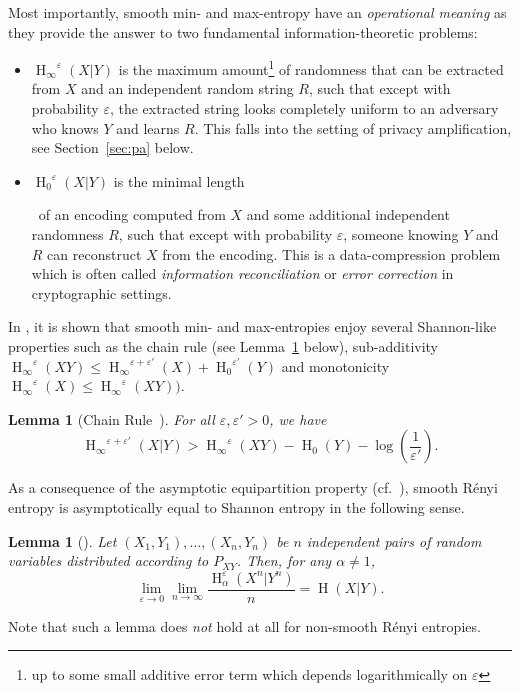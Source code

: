 \documentclass[final,11pt,a4paper]{report}
\newtheorem{lemma}[theorem]{Lemma}
\renewcommand*{\H}{\operatorname{H}}   %
\newcommand*{\hmin}{\ensuremath{\H_{\infty}}}
\newcommand*{\hmax}{\ensuremath{\H_{0}}}
\newcommand*{\hie}[2]{\ensuremath{\hmin^{#1}(#2)}}
\newcommand*{\hiee}[1]{\hie{\varepsilon}{#1}}
\newcommand*{\hmaxe}[2]{\ensuremath{\hmax^{#1}(#2)}}
\newcommand*{\hmaxee}[1]{\hmaxe{\varepsilon}{#1}}
\newcommand*{\eps}{\varepsilon}
\begin{document}
Most importantly, smooth min- and max-entropy have an
\emph{operational meaning} as they provide the answer to two
fundamental information-theoretic problems: 
\begin{itemize} 
\item $\hiee{X|Y}$ is the maximum amount\footnote{up to some small
    additive error term which depends logarithmically on $\eps$} of
  randomness that can be extracted from $X$ and an independent random
  string $R$, such that except with probability $\eps$, the extracted
  string looks completely uniform to an adversary who knows $Y$ and
  learns $R$. This falls into the setting of privacy amplification,
  see Section~\ref{sec:pa} below. 
\item $\hmaxee{X|Y}$ is the minimal
  length\addtocounter{footnote}{-1}\footnotemark\ of an encoding
  computed from $X$ and some additional independent randomness $R$,
  such that except with probability $\eps$, someone knowing $Y$ and
  $R$ can reconstruct $X$ from the encoding. This is a
  data-compression problem which is often called
  \emph{information reconciliation}
  or \emph{error correction} in cryptographic
  settings.
\end{itemize}

In \cite{RW05}, it is shown that smooth min- and max-entropies enjoy
several Shannon-like properties such as the chain rule (see Lemma~\ref{lem:chain} below),
sub-additivity $\hiee{XY} \leq
\hie{\eps+\eps'}{X} + \hmaxe{\eps'}{Y}$ and
monotonicity $\hiee{X} \leq \hiee{XY})$.

\begin{lemma}[Chain Rule~\cite{RW05}]\label{lem:chain}
For all $\varepsilon,\varepsilon' > 0$, we have 
\[\hie{\varepsilon+\varepsilon'}{X | Y} > \hie{\varepsilon}{XY}
- \hmax(Y) - \log{\left(\frac{1}{\varepsilon'}\right)}. \] 
\end{lemma}

As a consequence of the asymptotic equipartition property (cf.~\cite{CT91}), smooth R\'enyi entropy is asymptotically equal to
Shannon entropy in the following sense. 
\begin{lemma}[\cite{RW05,HR06}] \label{lem:asymptshannon}
Let $(X_1,Y_1), \ldots, (X_n, Y_n)$ be $n$ independent pairs of random
variables distributed according to $P_{XY}$. Then, for any
$\alpha \neq 1$,
\[ \lim_{\eps \rightarrow 0} \lim_{n \rightarrow \infty}
\frac{\H_{\alpha}^{\eps}(X^n | Y^n)}{n} = \H(X | Y).
\]
\end{lemma} 
Note that such a lemma does \emph{not} hold at all for non-smooth
R\'enyi entropies.
\end{document}
